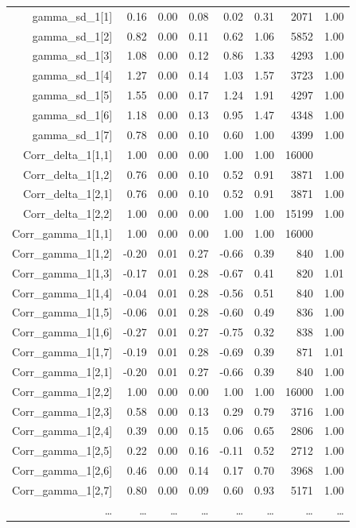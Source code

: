 \documentclass[oneside,a4paper]{article}
\begin{document}
\begin{table}[H]
\begin{tabular}{rrrrrrrr}
  gamma\_sd\_1[1] & 0.16 & 0.00 & 0.08 & 0.02 & 0.31 & 2071 & 1.00 \\ 
  gamma\_sd\_1[2] & 0.82 & 0.00 & 0.11 & 0.62 & 1.06 & 5852 & 1.00 \\ 
  gamma\_sd\_1[3] & 1.08 & 0.00 & 0.12 & 0.86 & 1.33 & 4293 & 1.00 \\ 
  gamma\_sd\_1[4] & 1.27 & 0.00 & 0.14 & 1.03 & 1.57 & 3723 & 1.00 \\ 
  gamma\_sd\_1[5] & 1.55 & 0.00 & 0.17 & 1.24 & 1.91 & 4297 & 1.00 \\ 
  gamma\_sd\_1[6] & 1.18 & 0.00 & 0.13 & 0.95 & 1.47 & 4348 & 1.00 \\ 
  gamma\_sd\_1[7] & 0.78 & 0.00 & 0.10 & 0.60 & 1.00 & 4399 & 1.00 \\ 
  Corr\_delta\_1[1,1] & 1.00 & 0.00 & 0.00 & 1.00 & 1.00 & 16000 &  \\ 
  Corr\_delta\_1[1,2] & 0.76 & 0.00 & 0.10 & 0.52 & 0.91 & 3871 & 1.00 \\ 
  Corr\_delta\_1[2,1] & 0.76 & 0.00 & 0.10 & 0.52 & 0.91 & 3871 & 1.00 \\ 
  Corr\_delta\_1[2,2] & 1.00 & 0.00 & 0.00 & 1.00 & 1.00 & 15199 & 1.00 \\ 
  Corr\_gamma\_1[1,1] & 1.00 & 0.00 & 0.00 & 1.00 & 1.00 & 16000 &  \\ 
  Corr\_gamma\_1[1,2] & -0.20 & 0.01 & 0.27 & -0.66 & 0.39 & 840 & 1.00 \\ 
  Corr\_gamma\_1[1,3] & -0.17 & 0.01 & 0.28 & -0.67 & 0.41 & 820 & 1.01 \\ 
  Corr\_gamma\_1[1,4] & -0.04 & 0.01 & 0.28 & -0.56 & 0.51 & 840 & 1.00 \\ 
  Corr\_gamma\_1[1,5] & -0.06 & 0.01 & 0.28 & -0.60 & 0.49 & 836 & 1.00 \\ 
  Corr\_gamma\_1[1,6] & -0.27 & 0.01 & 0.27 & -0.75 & 0.32 & 838 & 1.00 \\ 
  Corr\_gamma\_1[1,7] & -0.19 & 0.01 & 0.28 & -0.69 & 0.39 & 871 & 1.01 \\ 
  Corr\_gamma\_1[2,1] & -0.20 & 0.01 & 0.27 & -0.66 & 0.39 & 840 & 1.00 \\ 
  Corr\_gamma\_1[2,2] & 1.00 & 0.00 & 0.00 & 1.00 & 1.00 & 16000 & 1.00 \\ 
  Corr\_gamma\_1[2,3] & 0.58 & 0.00 & 0.13 & 0.29 & 0.79 & 3716 & 1.00 \\ 
  Corr\_gamma\_1[2,4] & 0.39 & 0.00 & 0.15 & 0.06 & 0.65 & 2806 & 1.00 \\ 
  Corr\_gamma\_1[2,5] & 0.22 & 0.00 & 0.16 & -0.11 & 0.52 & 2712 & 1.00 \\ 
  Corr\_gamma\_1[2,6] & 0.46 & 0.00 & 0.14 & 0.17 & 0.70 & 3968 & 1.00 \\ 
  Corr\_gamma\_1[2,7] & 0.80 & 0.00 & 0.09 & 0.60 & 0.93 & 5171 & 1.00 \\ 
  \dots{} & \dots{} & \dots{} & \dots{} & \dots{} & \dots{} & \dots{}
                                                                       & \dots{} \\
  \hline
\end{tabular}
\end{table}
\end{document}
